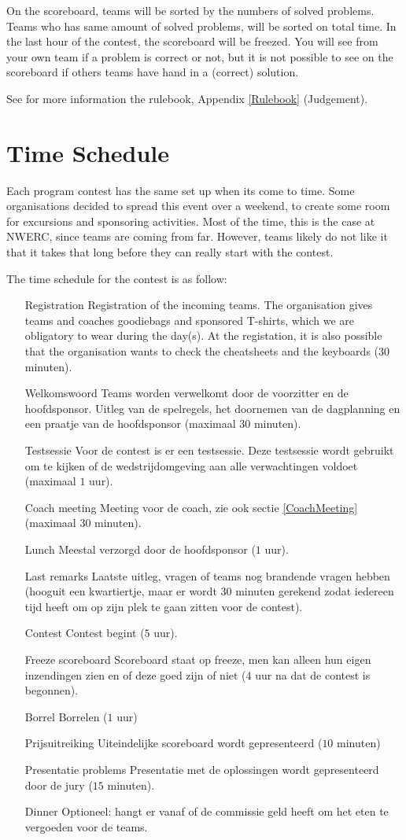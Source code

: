 On the scoreboard, teams will be sorted by the numbers of solved problems. Teams who has same amount of solved problems, will be sorted on total time. In the last hour of the contest, the scoreboard will be freezed. You will see from your own team if a problem is correct or not, but it is not possible to see on the scoreboard if others teams have hand in a (correct) solution.

See for more information the rulebook, Appendix \ref{Rulebook} (Judgement).

\section{Time Schedule}
Each program contest has the same set up when its come to time. Some organisations decided to spread this event over a weekend, to create some room for excursions and sponsoring activities. Most of the time, this is the case at NWERC, since teams are coming from far. However, teams likely do not like it that it takes that long before they can really start with the contest.

The time schedule for the contest is as follow:
\begin{itemize}
\item[Registration] Registration of the incoming teams. The organisation gives teams and coaches goodiebags and sponsored T-shirts, which we are obligatory to wear during the day(s). At the registation, it is also possible that the organisation wants to check the cheatsheets and the keyboards ($30$ minuten).
\item[Welkomswoord] Teams worden verwelkomt door de voorzitter en de hoofdsponsor. Uitleg van de spelregels, het doornemen van de dagplanning en een praatje van de hoofdsponsor (maximaal $30$ minuten).
\item[Testsessie] Voor de contest is er een testsessie. Deze testsessie wordt gebruikt om te kijken of de wedstrijdomgeving aan alle verwachtingen voldoet (maximaal $1$ uur).
\item[Coach meeting] Meeting voor de coach, zie ook sectie \ref{CoachMeeting} (maximaal $30$ minuten).
\item[Lunch] Meestal verzorgd door de hoofdsponsor ($1$ uur).
\item[Last remarks] Laatste uitleg, vragen of teams nog brandende vragen hebben (hooguit een kwartiertje, maar er wordt $30$ minuten gerekend zodat iedereen tijd heeft om op zijn plek te gaan zitten voor de contest).
\item[Contest] Contest begint ($5$ uur).
\item[Freeze scoreboard] Scoreboard staat op freeze, men kan alleen hun eigen inzendingen zien en of deze goed zijn of niet ($4$ uur na dat de contest is begonnen).
\item[Borrel] Borrelen ($1$ uur)
\item[Prijsuitreiking] Uiteindelijke scoreboard wordt gepresenteerd ($10$ minuten)
\item[Presentatie problems] Presentatie met de oplossingen wordt gepresenteerd door de jury ($15$ minuten).
\item[Dinner] Optioneel: hangt er vanaf of de commissie geld heeft om het eten te vergoeden voor de teams.
\end{itemize}